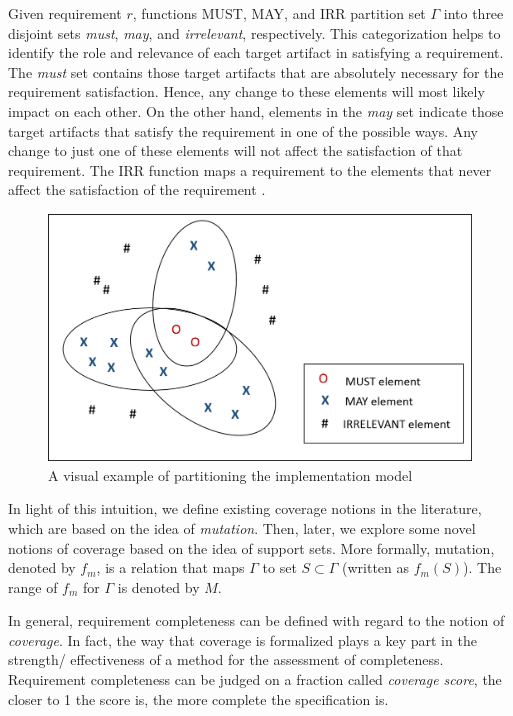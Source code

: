 Given requirement $r$, functions MUST, MAY, and IRR partition set $\Gamma$ into three disjoint sets \emph{must}, \emph{may}, and \emph{irrelevant}, respectively. This categorization helps to identify the role and relevance of each target artifact in satisfying a requirement. The \emph{must} set contains those target artifacts that are absolutely necessary for the requirement satisfaction. Hence, any change to these elements will most likely impact on each other. On the other hand, elements in the \emph{may} set indicate those target artifacts that satisfy the requirement in one of the possible ways.  Any change to just one of these elements will not affect the satisfaction of that requirement. The IRR function maps a requirement to the elements that never affect the satisfaction of the requirement \cite{Murugesan16:renext}.

\begin{figure}[htb]
\begin{center}
\includegraphics[width=\columnwidth]{figs/may_must.png}
\caption{A visual example of partitioning the implementation model}\label{fig:maymust}
\end{center}
\end{figure}

In light of this intuition, we define existing coverage notions in the literature, which are based on the idea of \emph{mutation}. Then, later, we explore some novel notions of coverage based on the idea of support sets.  More formally, mutation, denoted by $f_m$, is a relation that maps $\Gamma$ to set $S \subset \Gamma$ (written as $f_m (S)$). The range of $f_m$ for $\Gamma$ is denoted by $M$.

In general, requirement completeness can be defined with regard to the notion of \emph{coverage}. In fact, the way that coverage is formalized plays a key part in the strength/ effectiveness of a method for the assessment of completeness. Requirement completeness can be judged on a fraction called \emph{coverage score}, the closer to 1 the score is, the more complete the specification is. 

